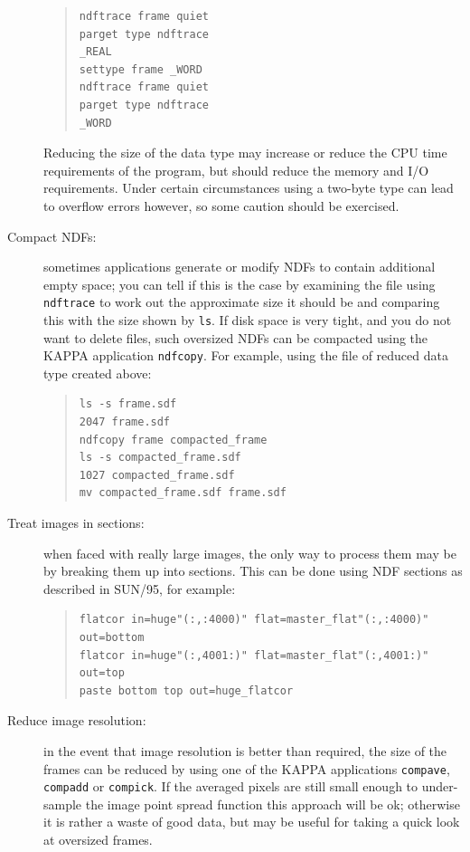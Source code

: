 \documentclass[twoside,11pt]{article}
\newcommand{\xref}[3]{#1}
\begin{document}
\begin{description}
  \begin{quote}
  \begin{verbatim}
ndftrace frame quiet
parget type ndftrace
_REAL
settype frame _WORD
ndftrace frame quiet
parget type ndftrace
_WORD
\end{verbatim}
  \end{quote}

   Reducing the size of the data type may increase or reduce the CPU time
   requirements of the program, but should reduce the memory and I/O
   requirements.
   Under certain circumstances using a two-byte type can lead to
   overflow errors however, so some caution should be exercised.

  \item[Compact NDFs:] sometimes applications generate or modify NDFs to
   contain additional empty space; you can tell if this is the case by
   examining the file using {\tt ndftrace} to work out the approximate size
   it should be and comparing this with the size shown by {\tt ls}.
   If disk space is very tight, and you do not want to delete files, such
   oversized NDFs can be compacted using the KAPPA application {\tt ndfcopy}.
   For example, using the file of reduced data type created above:

  \begin{quote}
  \begin{verbatim}
ls -s frame.sdf
2047 frame.sdf
ndfcopy frame compacted_frame
ls -s compacted_frame.sdf
1027 compacted_frame.sdf
mv compacted_frame.sdf frame.sdf
\end{verbatim}
  \end{quote}

  \item[Treat images in sections:] when faced with really large images, the
   only way to process them may be by breaking them up into sections.
   This can be done using \xref{NDF sections}{sun95}{se_ndfsect}
   as described in \xref{SUN/95}{sun95}{}\/\cite{SUN95}, for example:

  \begin{quote}
  \begin{verbatim}
flatcor in=huge"(:,:4000)" flat=master_flat"(:,:4000)" out=bottom
flatcor in=huge"(:,4001:)" flat=master_flat"(:,4001:)" out=top
paste bottom top out=huge_flatcor
\end{verbatim}
  \end{quote}

  \item[Reduce image resolution:] in the event that image resolution is
   better than required, the size of the frames can be reduced by using one
   of the KAPPA applications
  \xref{{\tt compave}}{sun95}{COMPAVE},
  \xref{{\tt compadd}}{sun95}{COMPADD} or
  \xref{{\tt compick}}{sun95}{COMPICK}.
   If the averaged pixels are still small enough to under-sample the
   image point spread function this approach will be ok; otherwise it is
   rather a waste of good data, but may be useful for taking a quick look
   at oversized frames.

\end{description}
\end{document}
